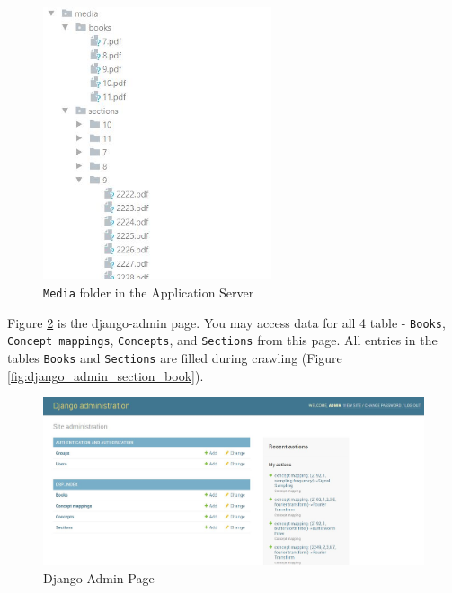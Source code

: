 \begin{figure}[!htbp]
  \centering
  \includegraphics[width=0.6\textwidth]{system_demonstration/demo_media_folder.jpg}
  \caption{\texttt{Media} folder in the Application Server}
  \label{fig:media_folder}
\end{figure}

Figure \ref{fig:django_admin} is the django-admin page. You may access data for all 4 table - \texttt{Books}, \texttt{Concept mappings}, \texttt{Concepts}, and \texttt{Sections} from this page. All entries in the tables \texttt{Books} and \texttt{Sections} are filled during crawling (Figure \ref{fig:django_admin_section_book}).

\begin{figure}[!htbp]
  \includegraphics[width=\textwidth]{system_demonstration/demo_django_admin.jpg}
  \caption{Django Admin Page}
  \label{fig:django_admin}
\end{figure}

